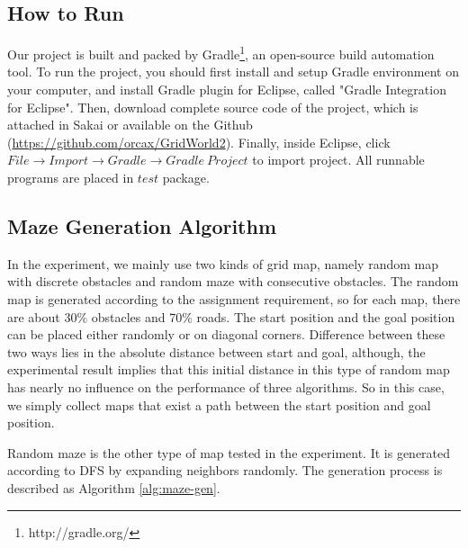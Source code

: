 \subsection{How to Run}

Our project is built and packed by Gradle\footnote{http://gradle.org/}, 
an open-source build automation tool. To run the project, you should first 
install and setup Gradle environment on your computer, and install Gradle plugin 
for Eclipse, called "Gradle Integration for Eclipse". Then, download complete 
source code of the project, which is attached in Sakai or available on the 
Github (\url{https://github.com/orcax/GridWorld2}). Finally, inside Eclipse,
click $File\rightarrow Import\rightarrow Gradle\rightarrow Gradle~Project$ to
import project. All runnable programs are placed in $test$ package.

\subsection{Maze Generation Algorithm}

In the experiment, we mainly use two kinds of grid map, namely random map with
discrete obstacles and random maze with consecutive obstacles. The random map
is generated according to the assignment requirement, so for each map, there
are about 30\% obstacles and 70\% roads. The start position and the goal
position can be placed either randomly or on diagonal corners. Difference
between these two ways lies in the absolute distance between start and goal,
although, the experimental result implies that this initial distance in this
type of random map has nearly no influence on the performance of three
algorithms. So in this case, we simply collect maps that exist a path between
the start position and goal position.

Random maze is the other type of map tested in the experiment. It is generated
according to DFS by expanding neighbors randomly. The generation process is 
described as Algorithm \ref{alg:maze-gen}.


